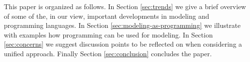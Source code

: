 This paper is organized as follows.
In Section \ref{sec:trends} we give a brief overview of some of the, 
in our view, important developments in modeling and programming 
languages. 
In Section \ref{sec:modeling-as-programming} we illustrate with examples how programming 
can be used for modeling.
In Section \ref{sec:concerns} we suggest discussion points to be reflected on
when considering a unified approach.
Finally Section \ref{sec:conclusion} concludes the paper.

